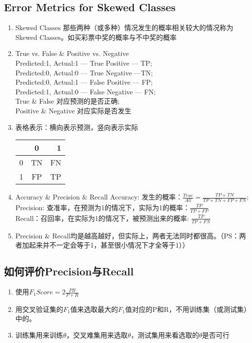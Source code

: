 \subsection{Error Metrics for Skewed Classes}
\begin{enumerate}
	\item Skewed Classes
	那些两种（或多种）情况发生的概率相关较大的情况称为Skewed Classes。如买彩票中奖的概率与不中奖的概率
	\item True vs. False \& Positive vs. Negative \\ 
	Predicted:1, Actual:1 --- True Positive --- TP; \\
	Predicted:0, Actual:0 --- True Negative ---TN; \\
	Predicted:0, Actual:1 --- False Positive --- FP; \\
	Predicted:1, Actual:0 --- False Negative --- FN; \\
	True \& False 对应预测的是否正确; \\
	Positive \& Negative 对应实际是否发生
	\item 表格表示：横向表示预测，竖向表示实际 \\ 
	\begin{tabular}{|l|c|r|}
	    \hline
	      & 0 & 1 \\ \hline
	    0 & TN & FN \\ \hline
	    1 & FP & TP \\ \hline
	\end{tabular}
	\item Accuracy \& Precision \& Recall
	Accuracy: 发生的概率：$\frac{True}{All} = \frac{TP+TN}{TP+TN+FP+FN}$;  \\
	Precision: 查准率，在预测为1的情况下，实际为1的概率：$\frac{TP}{TP+FP}$ \\
	Recall：召回率，在实际为1的情况下，被预测出来的概率: $\frac{TP}{TP+FN}$
	\item Precision \& Recall均是越高越好，但实际上，两者无法同时都很高。（PS：两者加起来并不一定会等于1，甚至很小情况下才全等于1））
\end{enumerate}

\subsection{如何评价Precision与Recall}
\begin{enumerate}
	\item 使用$F_1 Score = 2\frac{PR}{P+R}$
	\item 用交叉验证集的$F_1$值来选取最大的$F_1$值对应的P和R，不用训练集（或测试集）中的。
	\item 训练集用来训练$\theta$，交叉难集用来选取$\theta$，测试集用来看选取的$\theta$是否可行
\end{enumerate}



